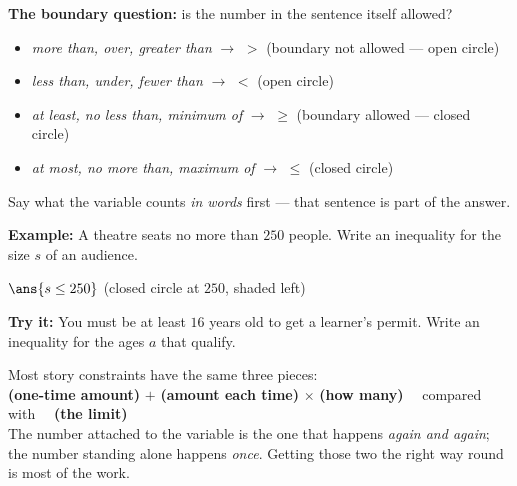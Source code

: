 \documentclass[12pt]{article}
\begin{document}


\begin{formulabox}
\textbf{The boundary question:} is the number in the sentence itself allowed?
\begin{itemize}[leftmargin=0.9cm, itemsep=0pt, topsep=2pt]
  \item \emph{more than, over, greater than} $\rightarrow$ $>$ \quad (boundary
  not allowed --- open circle)
  \item \emph{less than, under, fewer than} $\rightarrow$ $<$ \quad (open
  circle)
  \item \emph{at least, no less than, minimum of} $\rightarrow$ $\ge$ \quad
  (boundary allowed --- closed circle)
  \item \emph{at most, no more than, maximum of} $\rightarrow$ $\le$ \quad
  (closed circle)
\end{itemize}
Say what the variable counts \emph{in words} first --- that sentence is part of
the answer.
\end{formulabox}

\begin{examplebox}
\textbf{Example:} \quad A theatre seats no more than $250$ people. Write an
inequality for the size $s$ of an audience.

$\ans{s \le 250}$ \quad (closed circle at $250$, shaded left)
\end{examplebox}

\begin{tryitbox}
\textbf{Try it:} \quad You must be at least $16$ years old to get a learner's
permit. Write an inequality for the ages $a$ that qualify.\\[2pt]
\end{tryitbox}


\begin{formulabox}
Most story constraints have the same three pieces:\\[2pt]
\textbf{(one-time amount)} $+$ \textbf{(amount each time)} $\times$
\textbf{(how many)} \ \ compared with \ \ \textbf{(the limit)}\\[3pt]
The number attached to the variable is the one that happens \emph{again and
again}; the number standing alone happens \emph{once}. Getting those two the
right way round is most of the work.
\end{formulabox}
\end{document}
